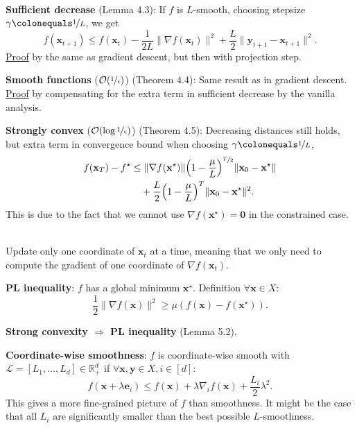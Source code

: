 \documentclass{article}
\newcommand{\lft}{\mathopen{}\mathclose\bgroup\left}
\newcommand{\rgt}{\aftergroup\egroup\right}
\newcommand{\R}{\mathbb{R}}
\renewcommand{\vec}[1]{\mathbf{#1}}
\newenvironment{topic}[1]
{\textbf{\sffamily \colorbox{black}{\rlap{\textbf{\textcolor{white}{#1}}}\hspace{\linewidth}\hspace{-2\fboxsep}}} \\ \vspace{0.2cm}}
{}
\begin{document}
\begin{multicols*}{2}
\begin{topic}{4 Projected gradient descent}
        \textbf{Sufficient decrease} (Lemma 4.3): If $f$ is $L$-smooth,
        choosing stepsize $\gamma \colonequals \nicefrac{1}{L}$, we get \[
            f(\vec{x}_{t+1}) \leq f(\vec{x}_t) - \frac{1}{2L} \| \nabla f(\vec{x}_t) \|^2 + \frac{L}{2} \| \vec{y}_{t+1} - \vec{x}_{t+1} \|^2.
        \]
        \underline{Proof} by the same as gradient descent, but then with projection step.

        \textbf{Smooth functions} ($\mathcal{O}(\nicefrac{1}{\epsilon})$) (Theorem 4.4): Same result
        as in gradient descent. \underline{Proof} by compensating for the extra term in sufficient
        decrease by the vanilla analysis.

        \textbf{Strongly convex} ($\mathcal{O}(\log \nicefrac{1}{\epsilon})$) (Theorem 4.5):
        Decreasing distances still holds, but extra term in convergence bound when choosing
        $\gamma \colonequals \nicefrac{1}{L}$,
        \begin{align*}
            f(\vec{x}_T) - f^\star & \leq \| \nabla f(\vec{x}^\star) \| \lft( 1 - \frac{\mu}{L} \rgt)^{\nicefrac{T}{2}} \| \vec{x}_0 - \vec{x}^\star \| \\
                                   & \quad + \frac{L}{2} \lft( 1 - \frac{\mu}{L} \rgt)^T \| \vec{x}_0 - \vec{x}^\star \|^2.
        \end{align*}
        This is due to the fact that we cannot use $\nabla f(\vec{x}^\star) = \vec{0}$ in the constrained
        case.
    \end{topic}

    \begin{topic}{5 Coordinate descent}
        Update only one coordinate of $\vec{x}_t$ at a time, meaning that we only need to compute the
        gradient of one coordinate of $\nabla f(\vec{x}_t)$.

        \textbf{PL inequality}: $f$ has a global minimum $\vec{x}^\star$. Definition $\forall \vec{x}
            \in X$: \[
            \frac{1}{2} \| \nabla f(\vec{x}) \|^2 \geq \mu (f(\vec{x}) - f(\vec{x}^\star)).
        \]

        \textbf{Strong convexity $\Rightarrow$ PL inequality} (Lemma 5.2).

        \textbf{Coordinate-wise smoothness}: $f$ is coordinate-wise smooth with $\mathcal{L} =
            [L_1, \ldots, L_d] \in \R_+^d$ if $\forall \vec{x}, \vec{y} \in X, i \in [d]$: \[
            f(\vec{x} + \lambda \vec{e}_i) \leq f(\vec{x}) + \lambda \nabla_i f(\vec{x}) + \frac{L_i}{2} \lambda^2.
        \]
        This gives a more fine-grained picture of $f$ than smoothness. It might be the case that all $L_i$
        are significantly smaller than the best possible $L$-smoothness.


\end{topic}
\end{multicols*}
\end{document}
